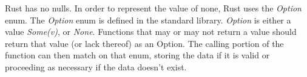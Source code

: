 \documentclass[12pt]{article}
\begin{document}
\begin{flushleft}
Rust has no nulls. In order to represent the value of none, Rust uses the
\textit{Option} enum. The \textit{Option} enum is defined in the standard
library. \textit{Option} is either a value \textit{Some(v)}, or \textit{None}.
Functions that may or may not return a value should return that value (or lack
thereof) as an Option. The calling portion of the function can then match on
that enum, storing the data if it is valid or proceeding as necessary if the
data doesn't exist.



\cite{rustforrustaceans} \\
\cite{rust-lang.org} \\
\cite{rust-by-example} \\
\cite{the-c-programming-language} \\
\cite{noboilerplate}


 

\end{flushleft}
\end{document}

